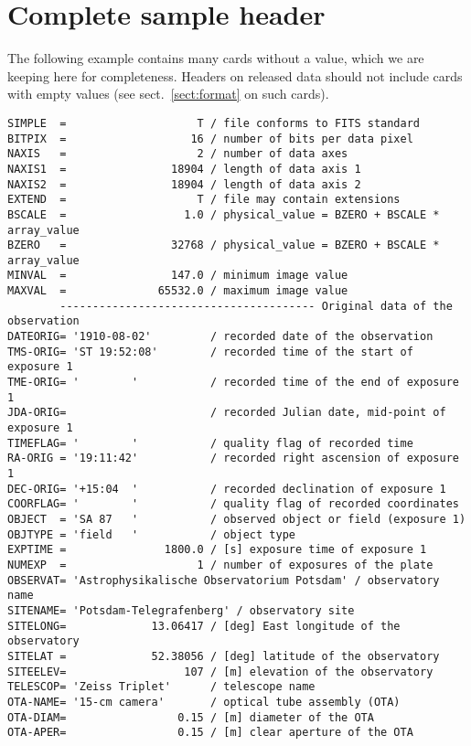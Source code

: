 \documentclass[11pt]{ivoa}
\begin{document}
\section{Complete sample header}
\label{sect:samplehdr}

The following example contains many cards without a value, which we are
keeping here for completeness.  Headers on released data should not
include cards with empty values (see sect.~\ref{sect:format} on such
cards).

\begin{lstlisting}
SIMPLE  =                    T / file conforms to FITS standard
BITPIX  =                   16 / number of bits per data pixel
NAXIS   =                    2 / number of data axes
NAXIS1  =                18904 / length of data axis 1
NAXIS2  =                18904 / length of data axis 2
EXTEND  =                    T / file may contain extensions
BSCALE  =                  1.0 / physical_value = BZERO + BSCALE * array_value
BZERO   =                32768 / physical_value = BZERO + BSCALE * array_value
MINVAL  =                147.0 / minimum image value
MAXVAL  =              65532.0 / maximum image value
        --------------------------------------- Original data of the observation
DATEORIG= '1910-08-02'         / recorded date of the observation
TMS-ORIG= 'ST 19:52:08'        / recorded time of the start of exposure 1
TME-ORIG= '        '           / recorded time of the end of exposure 1
JDA-ORIG=                      / recorded Julian date, mid-point of exposure 1
TIMEFLAG= '        '           / quality flag of recorded time
RA-ORIG = '19:11:42'           / recorded right ascension of exposure 1
DEC-ORIG= '+15:04  '           / recorded declination of exposure 1
COORFLAG= '        '           / quality flag of recorded coordinates
OBJECT  = 'SA 87   '           / observed object or field (exposure 1)
OBJTYPE = 'field   '           / object type
EXPTIME =               1800.0 / [s] exposure time of exposure 1
NUMEXP  =                    1 / number of exposures of the plate
OBSERVAT= 'Astrophysikalische Observatorium Potsdam' / observatory name
SITENAME= 'Potsdam-Telegrafenberg' / observatory site
SITELONG=             13.06417 / [deg] East longitude of the observatory
SITELAT =             52.38056 / [deg] latitude of the observatory
SITEELEV=                  107 / [m] elevation of the observatory
TELESCOP= 'Zeiss Triplet'      / telescope name
OTA-NAME= '15-cm camera'       / optical tube assembly (OTA)
OTA-DIAM=                 0.15 / [m] diameter of the OTA
OTA-APER=                 0.15 / [m] clear aperture of the OTA

\end{lstlisting}
\end{document}
